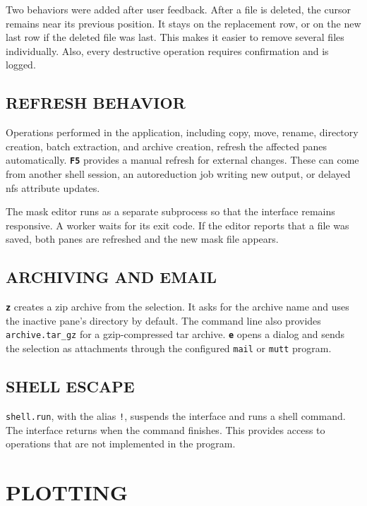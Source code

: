\documentclass[tm]{ornltm}
\newcommand{\cmd}[1]{\texttt{#1}}
\newcommand{\key}[1]{\textbf{\texttt{#1}}}
\begin{document}
Two behaviors were added after user feedback. After a file is deleted, the
cursor remains near its previous position. It stays on the replacement row, or
on the new last row if the deleted file was last. This makes it easier to remove
several files individually. Also, every destructive operation requires
confirmation and is logged.

\subsection{REFRESH BEHAVIOR}

Operations performed in the application, including copy, move, rename, directory
creation, batch extraction, and archive creation, refresh the affected panes
automatically. \key{F5} provides a manual refresh for external changes. These
can come from another shell session, an autoreduction job writing new output, or
delayed \ac{nfs} attribute updates.

The mask editor runs as a separate subprocess so that the interface remains
responsive. A worker waits for its exit code. If the editor reports that a file
was saved, both panes are refreshed and the new mask file appears.

\subsection{ARCHIVING AND EMAIL}

\key{z} creates a zip archive from the selection. It asks for the archive name
and uses the inactive pane's directory by default. The command line also provides
\cmd{archive.tar\_gz} for a gzip-compressed tar archive. \key{e} opens a dialog
and sends the selection as attachments through the configured \texttt{mail} or
\texttt{mutt} program.

\subsection{SHELL ESCAPE}

\cmd{shell.run}, with the alias \texttt{!}, suspends the interface and runs a
shell command. The interface returns when the command finishes. This provides
access to operations that are not implemented in the program.

\section{PLOTTING}
\label{sec:plot}
\end{document}
